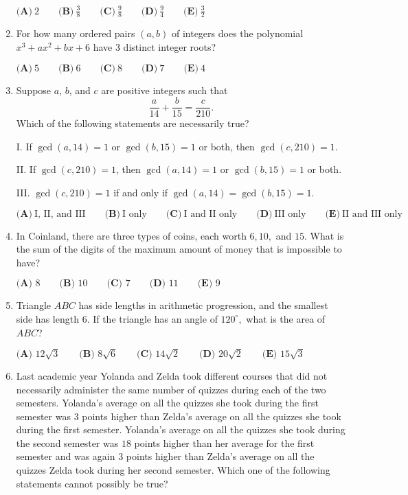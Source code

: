 \documentclass{article}
\begin{document}
\begin{enumerate}[label=\arabic*., itemsep=0.5em]
\(\textbf{(A)}~2\qquad\textbf{(B)}~\frac{3}{8}\qquad\textbf{(C)}~\frac{9}{8}\qquad\textbf{(D)}~\frac{9}{4}\qquad\textbf{(E)}~\frac{3}{2}\)\par \vspace{0.5em}\item For how many ordered pairs \((a,b)\) of integers does the polynomial \(x^3+ax^2+bx+6\) have \(3\) distinct integer roots?

\(\textbf{(A)}\ 5 \qquad\textbf{(B)}\ 6 \qquad\textbf{(C)}\ 8 \qquad\textbf{(D)}\ 7 \qquad\textbf{(E)}\ 4\)\par \vspace{0.5em}\item Suppose \(a\), \(b\), and \(c\) are positive integers such that
\begin{equation*}
\frac{a}{14}+\frac{b}{15}=\frac{c}{210}.
\end{equation*}
Which of the following statements are necessarily true?

I. If \(\gcd(a,14)=1\) or \(\gcd(b,15)=1\) or both, then \(\gcd(c,210)=1\).

II. If \(\gcd(c,210)=1\), then \(\gcd(a,14)=1\) or \(\gcd(b,15)=1\) or both.

III. \(\gcd(c,210)=1\) if and only if \(\gcd(a,14)=\gcd(b,15)=1\).

\(\textbf{(A)}~\text{I, II, and III}\qquad\textbf{(B)}~\text{I only}\qquad\textbf{(C)}~\text{I and II only}\qquad\textbf{(D)}~\text{III only}\qquad\textbf{(E)}~\text{II and III only}\)\par \vspace{0.5em}\item In Coinland, there are three types of coins, each worth \(6, 10,\) and \(15.\) What is the sum of the digits of the maximum amount of money that is impossible to have?

\(\textbf{(A) }8\qquad\textbf{(B) }10\qquad\textbf{(C) }7\qquad\textbf{(D) }11\qquad\textbf{(E) }9\)\par \vspace{0.5em}\item Triangle \(ABC\) has side lengths in arithmetic progression, and the smallest side has length \(6\). If the triangle has an angle of \(120^\circ,\) what is the area of \(ABC\)?

\(\textbf{(A) }12\sqrt{3}\qquad\textbf{(B) }8\sqrt{6}\qquad\textbf{(C) }14\sqrt{2}\qquad\textbf{(D) }20\sqrt{2}\qquad\textbf{(E) }15\sqrt{3}\)\par \vspace{0.5em}\item Last academic year Yolanda and Zelda took different courses that did not necessarily administer the same number of quizzes during each of the two semesters. Yolanda's average on all the quizzes she took during the first semester was \(3\) points higher than Zelda's average on all the quizzes she took during the first semester. Yolanda's average on all the quizzes she took during the second semester was \(18\) points higher than her average for the first semester and was again \(3\) points higher than Zelda's average on all the quizzes Zelda took during her second semester. Which one of the following statements cannot possibly be true?


\end{enumerate}
\end{document}
